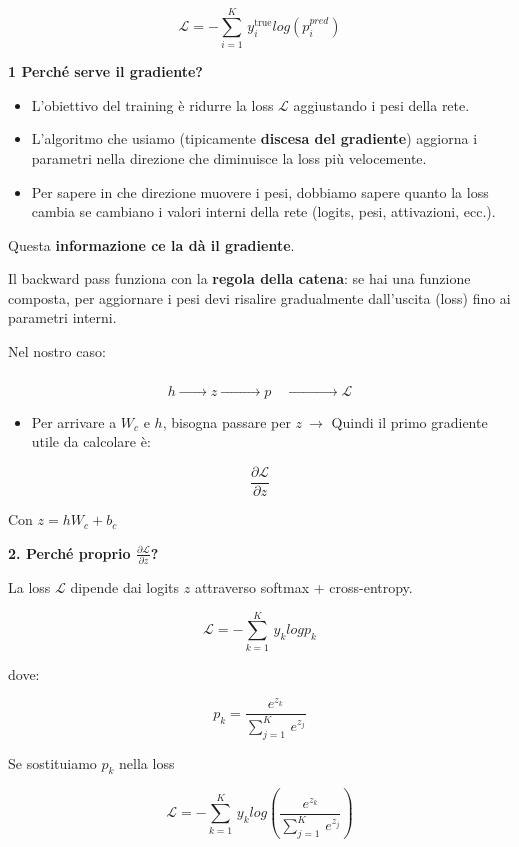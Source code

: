 \documentclass[
  11pt,
]{article}
\begin{document}
\[\mathcal{L} = - \sum_{i = 1}^{K}\, y_{i}^{\text{true}}log\left( p_{i}^{pred} \right)\]

\textbf{1 Perché serve il gradiente?}

\begin{itemize}
\item
  L'obiettivo del training è ridurre la loss
  \(\mathcal{L}\) aggiustando i pesi della rete.
\item
  L'algoritmo che usiamo (tipicamente \textbf{discesa
  del gradiente}) aggiorna i parametri nella direzione che diminuisce la
  loss più velocemente.
\item
  Per sapere in che direzione muovere i pesi, dobbiamo sapere quanto la
  loss cambia se cambiano i valori interni della rete (logits, pesi,
  attivazioni, ecc.).
\end{itemize}

Questa \textbf{informazione ce la dà il gradiente}.

Il backward pass funziona con la \textbf{regola della catena}: se hai
una funzione composta, per aggiornare i pesi devi risalire gradualmente
dall'uscita (loss) fino ai parametri interni.

Nel nostro caso:

\[h\overset{\phantom{W_{c},b_{c}\ }}{\rightarrow}z\overset{\phantom{\text{ softmax}\ }}{\rightarrow}p\overset{\phantom{\text{ cross-entropy}\ }}{\rightarrow}\mathcal{L}\]

\begin{itemize}
\item
  Per arrivare a \(W_{c}\) e \(h\), bisogna passare per
  \(z\  \rightarrow\) Quindi il primo gradiente utile da calcolare è:
\end{itemize}


\[\frac{\partial\mathcal{L}}{\partial z}\]

Con \(z = hW_{c} + b_{c}\)


\textbf{2. Perché proprio $\frac{\partial\mathcal{L}}{\partial z}$?}


La loss $\mathcal{L}$ dipende dai logits $z$ attraverso softmax + cross-entropy.


\[\mathcal{L} = - \sum_{k = 1}^{K}\, y_{k}logp_{k}\]

dove:

\[p_{k} = \frac{e^{z_{k}}}{\sum_{j = 1}^{K}\, e^{z_{j}}}\]


Se sostituiamo \(p_{k}\) nella loss


\[\mathcal{L} = - \sum_{k = 1}^{K}\, y_{k}log\left( \frac{e^{z_{k}}}{\sum_{j = 1}^{K}\, e^{z_{j}}} \right)\]
\end{document}

